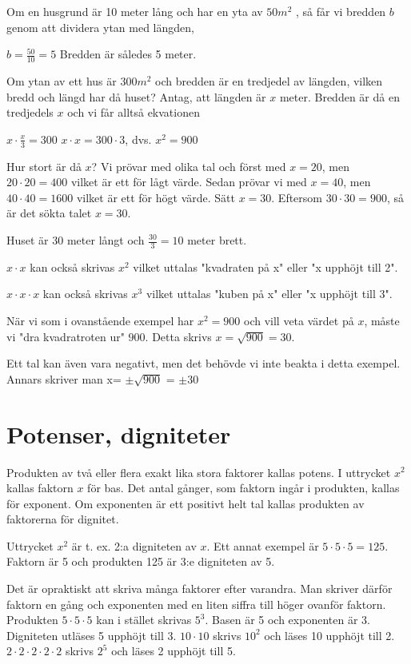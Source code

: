 Om en husgrund är 10 meter lång och har en yta av $50 m^2$ , så får vi bredden
$b$ genom att dividera ytan med längden,

$b = \frac{50}{10} = 5$ Bredden är således 5 meter.

Om ytan av ett hus är $300 m^2$ och bredden är en tredjedel av längden, vilken
bredd och längd har då huset?
Antag, att längden är $x$ meter. Bredden är då en tredjedels $x$ och vi får
alltså ekvationen

$x \cdot \frac{x}{3} = 300$ $x \cdot x = 300 \cdot 3$, dvs. $x^2 = 900$

Hur stort är då $x$?
Vi prövar med olika tal och först med $x = 20$, men $20 \cdot 20 = 400$ vilket
är ett för lågt värde. Sedan prövar vi med $x = 40$, men $40 \cdot 40 = 1600$
vilket är ett för högt värde. Sätt $x = 30$. Eftersom $30 \cdot 30 = 900$, så är
det sökta talet $x = 30$.

Huset är 30 meter långt och $\frac{30}{3} = 10$ meter brett.

$x \cdot x$ kan också skrivas $x^2$ vilket uttalas "kvadraten på x" eller
"x upphöjt till 2".

$x \cdot x \cdot x$ kan också skrivas $x^3$ vilket uttalas "kuben på x" eller
"x upphöjt till 3".

När vi som i ovanstående exempel har $x^2 = 900$ och vill veta värdet på $x$,
måste vi "dra kvadratroten ur" $900$.
Detta skrivs $x = \sqrt{900} = 30$.

Ett tal kan även vara negativt, men det behövde vi inte beakta i detta exempel.
Annars skriver man x= $\pm \sqrt{900}$ = $\pm 30$

\section{Potenser, digniteter}

Produkten av två eller flera exakt lika stora faktorer kallas potens. I
uttrycket $x^2$ kallas faktorn $x$ för bas. Det antal gånger, som faktorn ingår
i produkten, kallas för exponent. Om exponenten är ett positivt helt tal
kallas produkten av faktorerna för dignitet.

Uttrycket $x^2$ är t. ex. 2:a digniteten av $x$.
Ett annat exempel är $5 \cdot 5 \cdot 5 = 125$.
Faktorn är 5 och produkten 125 är 3:e digniteten av 5.

Det är opraktiskt att skriva många faktorer efter varandra. Man skriver därför
faktorn en gång och exponenten med en liten siffra till höger ovanför faktorn.
Produkten $5 \cdot 5 \cdot 5$ kan i stället skrivas $5^3$.
Basen är 5 och exponenten är 3. Digniteten utläses 5 upphöjt till 3.
$10 \cdot 10$ skrivs $10^2$ och läses 10 upphöjt till 2.
$2 \cdot 2 \cdot 2 \cdot 2 \cdot 2$ skrivs $2^5$ och läses 2 upphöjt
till 5.

